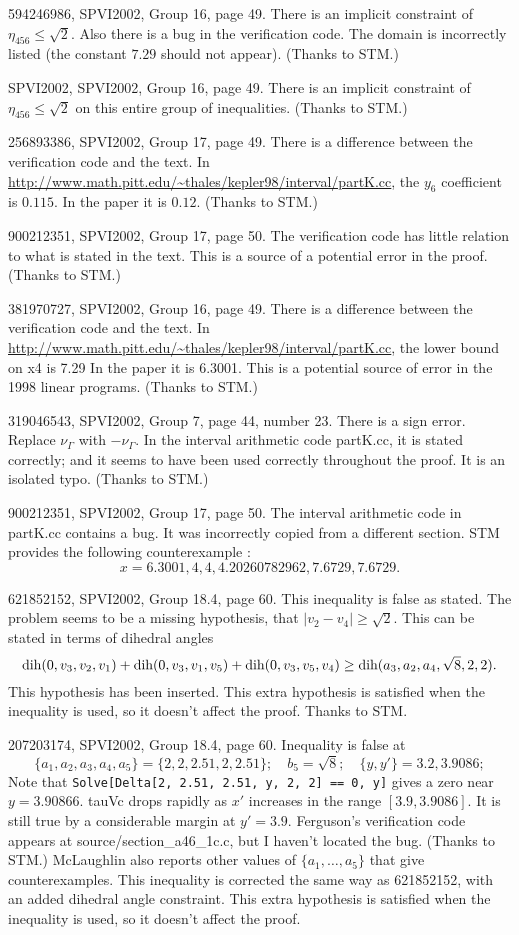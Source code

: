 \documentclass[11pt]{amsart}
\def\op#1{{\text{#1}}}
\def\text{\hbox}
\begin{document}
594246986, SPVI2002, Group 16, page 49.  There is an implicit constraint of $\eta_{456}\le \sqrt2$.  Also there is a bug in the verification code.  The domain is incorrectly listed (the constant $7.29$ should not appear).  (Thanks to STM.)

SPVI2002, SPVI2002, Group 16, page 49.  There is an implicit constraint of $\eta_{456}\le\sqrt2$ on this entire group of inequalities.
(Thanks to STM.)

256893386, SPVI2002, Group 17, page 49.  There is a difference between the verification code and the text.  In \url{http://www.math.pitt.edu/~thales/kepler98/interval/partK.cc}, the $y_6$ coefficient is $0.115$.  In the paper it is $0.12$.
(Thanks to STM.)

900212351, SPVI2002, Group 17, page 50.  The verification code has little relation to what is stated in the text.  This is a source of a potential error in the proof. (Thanks to STM.)

381970727, SPVI2002, Group 16, page 49.   There is a difference between the verification code and the text.  In \url{http://www.math.pitt.edu/~thales/kepler98/interval/partK.cc}, the lower bound on x4 is 7.29  In the paper it is 6.3001.  This is a potential source of error in the 1998 linear programs.  (Thanks to STM.)

319046543, SPVI2002, Group 7, page 44, number 23.  There is a sign error.
Replace $\nu_\Gamma$ with $-\nu_\Gamma$.  In the interval arithmetic
code partK.cc, it is stated correctly; and it seems to have been used correctly throughout the proof.  It is an isolated typo.   (Thanks to STM.)

900212351, SPVI2002, Group 17, page 50.  The interval arithmetic code
in partK.cc contains a bug.  
It was incorrectly copied from a different section.
STM provides the following counterexample :
  $$
  x = {6.3001, 4,4, 4.20260782962, 7.6729, 7.6729}.
  $$
  
621852152, SPVI2002, Group 18.4, page 60.
This inequality is false as stated.  
The problem seems to be a missing hypothesis,
that $|v_2-v_4|\ge\sqrt2$.  This can be
stated in terms of dihedral angles
$$
\op{dih}(0,v_3,v_2,v_1) + \op{dih}(0,v_3,v_1,v_5) + \op{dih}(0,v_3,v_5,v_4) \ge \op{dih}(a_3,a_2,a_4,\sqrt{8},2,2).
$$
This hypothesis has been inserted.
This extra hypothesis is satisfied
   when the inequality is used, so it doesn't affect
   the proof.
Thanks to STM.

207203174, SPVI2002, Group 18.4, page 60. 
Inequality is false at 
  $$\{a_1,a_2,a_3,a_4,a_5\}=\{2,2,2.51,2,2.51\}; \quad
   b_5=\sqrt{8};\quad  \{y,y'\}={3.2,3.9086};
   $$
   Note that 
   {\tt Solve[Delta[2, 2.51, 2.51, y, 2, 2] == 0, y]} gives a zero
   near $y = 3.90866$.
   tauVc drops rapidly as $x'$ increases in the range $[3.9,3.9086]$.
   It is still true by a considerable margin at $y'=3.9$.
   Ferguson's verification code appears at 
   source/section\_a46\_1c.c, but I haven't
   located the bug. (Thanks to STM.)
   McLaughlin also reports other values of $\{a_1,\ldots,a_5\}$ that give
   counterexamples.
   This inequality is corrected the same way
   as 621852152, with an added dihedral angle
   constraint.  This extra hypothesis is satisfied
   when the inequality is used, so it doesn't affect
   the proof.
\end{document}
